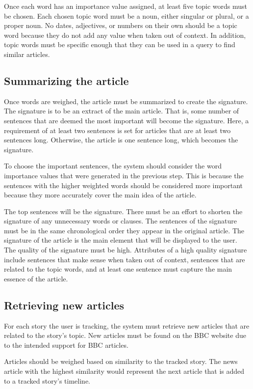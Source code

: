 \documentclass[11pt,titlepage]{report}
\begin{document}
Once each word has an importance value assigned, at least five topic words must be chosen. Each chosen topic word must be a noun, either singular or plural, or a proper noun. No dates, adjectives, or numbers on their own should be a topic word because they do not add any value when taken out of context. In addition, topic words must be specific enough that they can be used in a query to find similar articles.

\subsection{Summarizing the article}
Once words are weighed, the article must be summarized to create the signature. The signature is to be an extract of the main article. That is, some number of sentences that are deemed the most important will become the signature. Here, a requirement of at least two sentences is set for articles that are at least two sentences long. Otherwise, the article is one sentence long, which becomes the signature.

To choose the important sentences, the system should consider the word importance values that were generated in the previous step. This is because the sentences with the higher weighted words should be considered more important because they more accurately cover the main idea of the article.

The top sentences will be the signature. There must be an effort to shorten the signature of any unnecessary words or clauses. The sentences of the signature must be in the same chronological order they appear in the original article. The signature of the article is the main element that will be displayed to the user. The quality of the signature must be high. Attributes of a high quality signature include sentences that make sense when taken out of context, sentences that are related to the topic words, and at least one sentence must capture the main essence of the article.

\subsection{Retrieving new articles}
For each story the user is tracking, the system must retrieve new articles that are related to the story's topic. New articles must be found on the BBC website due to the intended support for BBC articles.

Articles should be weighed based on similarity to the tracked story. The news article with the highest similarity would represent the next article that is added to a tracked story's timeline. 
\end{document}
